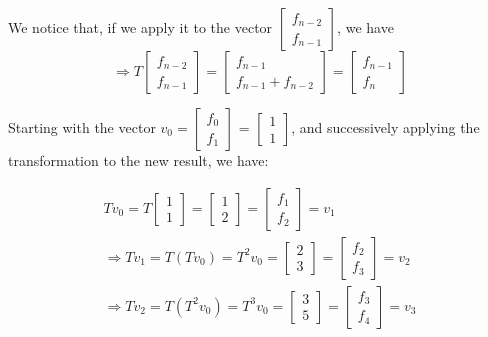 \documentclass{article}
\begin{document}
We notice that, if we apply it to the vector $\begin{bmatrix}
    f_{n - 2} \\
        f_{n - 1}
\end{bmatrix}$, we have
\begin{equation*}
    \Rightarrow
    T \begin{bmatrix}
        f_{n - 2} \\
        f_{n - 1}
    \end{bmatrix} =
    \begin{bmatrix}
        f_{n - 1} \\
        f_{n - 1} + f_{n - 2}
    \end{bmatrix} =
    \begin{bmatrix}
        f_{n - 1} \\
        f_{n}
    \end{bmatrix}
\end{equation*}

Starting with the vector $v_0 = \begin{bmatrix}
    f_{0} \\
        f_{1}
\end{bmatrix}$ = $\begin{bmatrix}
    1 \\
    1
\end{bmatrix}$, and successively applying the transformation to the new result,
we have:

\begin{equation*}
    \begin{aligned}
    Tv_0 = T\begin{bmatrix}
        1 \\
        1
    \end{bmatrix} = \begin{bmatrix}
        1\\
        2
    \end{bmatrix}=\begin{bmatrix}
        f_1\\
        f_2
    \end{bmatrix} = v_1\\
    \Rightarrow
    Tv_1 = T(Tv_0) = T^2 v_0 =\begin{bmatrix}
        2\\
        3
    \end{bmatrix} = \begin{bmatrix}
        f_2\\
        f_3
    \end{bmatrix}  = v_2 \\
    \Rightarrow
    Tv_2 = T(T^2 v_0) = T^3 v_0 =\begin{bmatrix}
        3\\
        5
    \end{bmatrix} = \begin{bmatrix}
        f_3\\
        f_4
    \end{bmatrix}  = v_3
    \end{aligned}
\end{equation*}
\end{document}
